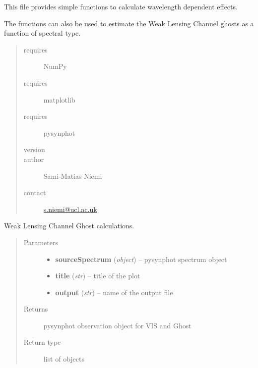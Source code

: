 \documentclass[a4paper,11pt,english]{sphinxmanual}
\begin{document}
\label{ETC:module-ETC.fluxEstimates}
This file provides simple functions to calculate wavelength dependent effects.

The functions can also be used to estimate the Weak Lensing Channel ghosts as a function
of spectral type.
\begin{quote}\begin{description}
\item[{requires}] \leavevmode
NumPy

\item[{requires}] \leavevmode
matplotlib

\item[{requires}] \leavevmode
pysynphot

\item[{version}] 

\item[{author}] \leavevmode
Sami-Matias Niemi

\item[{contact}] \leavevmode
\href{mailto:s.niemi@ucl.ac.uk}{s.niemi@ucl.ac.uk}

\end{description}\end{quote}

\begin{fulllineitems}
\label{ETC:ETC.fluxEstimates.ghostCalculations}
Weak Lensing Channel Ghost calculations.
\begin{quote}\begin{description}
\item[{Parameters}] \leavevmode\begin{itemize}
\item {} 
\textbf{sourceSpectrum} (\emph{object}) -- pysynphot spectrum object

\item {} 
\textbf{title} (\emph{str}) -- title of the plot

\item {} 
\textbf{output} (\emph{str}) -- name of the output file

\end{itemize}

\item[{Returns}] \leavevmode
pysynphot observation object for VIS and Ghost

\item[{Return type}] \leavevmode
list of objects

\end{description}\end{quote}

\end{fulllineitems}
\end{document}
